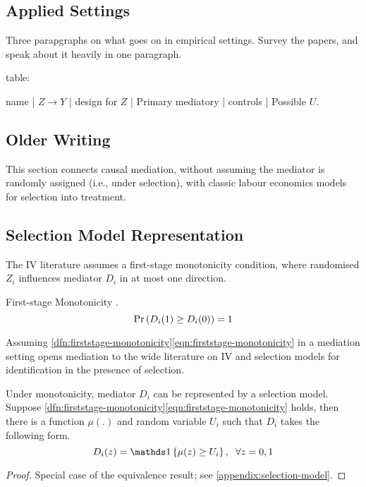 \subsection{Applied Settings}

Three parapgraphs on what goes on in empirical settings.
Survey the papers, and speak about it heavily in one paragraph.

table:

name | $Z \to Y$ | design for $Z$ | Primary mediatory | controls | Possible $U$.






\newpage
\subsection{Older Writing}



This section connects causal mediation, without assuming the mediator is randomly assigned (i.e., under selection), with classic labour economics models for selection into treatment.

\subsection{Selection Model Representation}
\label{sec:selection-model}
The IV literature assumes a first-stage monotonicity condition, where randomised $Z_i$ influences mediator $D_i$ in at most one direction.
\begin{definition}
    \label{dfn:firststage-monotonicity}
    First-stage Monotonicity \citep{imbens1994identification}.
    \begin{equation}
        \label{eqn:firststage-monotonicity}
        \Pr\left(  D_i(1) \geq D_i(0) \right) = 1    
    \end{equation}
\end{definition}

Assuming \ref{dfn:firststage-monotonicity}\eqref{eqn:firststage-monotonicity}
in a mediation setting opens mediation to the wide literature on IV and selection models for identification in the presence of selection. 
\begin{theorem}
    \label{thm:selection-model}
    Under monotonicity, mediator $D_i$ can be represented by a selection model. \\
    Suppose \ref{dfn:firststage-monotonicity}\eqref{eqn:firststage-monotonicity} holds, then there is a function $\mu(.)$ and random variable $U_i$ such that $D_i$ takes the following form.
    \[ D_i(z) = \indicator{ \mu(z) \geq U_i}, \;\; \forall z = 0,1 \]
\end{theorem}
\begin{proof}
    Special case of the \cite{vytlacil2002independence} equivalence result; see \autoref{appendix:selection-model}.
\end{proof}

